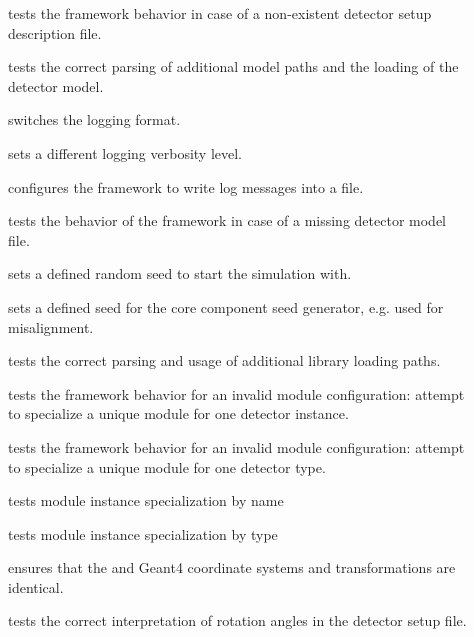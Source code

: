\begin{description}
    \item[] tests the framework behavior in case of a non-existent detector setup description file.
    \item[] tests the correct parsing of additional model paths and the loading of the detector model.
    \item[] switches the logging format.
    \item[] sets a different logging verbosity level.
    \item[] configures the framework to write log messages into a file.
    \item[] tests the behavior of the framework in case of a missing detector model file.
    \item[] sets a defined random seed to start the simulation with.
    \item[] sets a defined seed for the core component seed generator, e.g. used for misalignment.
    \item[] tests the correct parsing and usage of additional library loading paths.
    \item[] tests the framework behavior for an invalid module configuration: attempt to specialize a unique module for one detector instance.
    \item[] tests the framework behavior for an invalid module configuration: attempt to specialize a unique module for one detector type.
    \item[] tests module instance specialization by name
    \item[] tests module instance specialization by type
    \item[] ensures that the \apsq and Geant4 coordinate systems and transformations are identical.
    \item[] tests the correct interpretation of rotation angles in the detector setup file.

\end{description}
